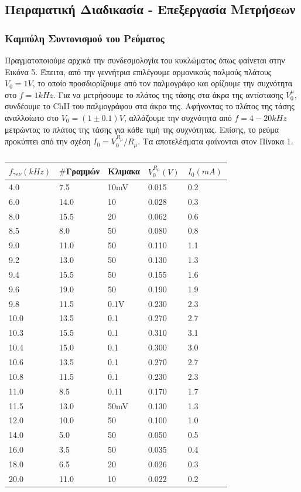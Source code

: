 \documentclass[a4paper]{article}
\begin{document}
\subsection*{Πειραματική Διαδικασία - Επεξεργασία Μετρήσεων}
\subsubsection*{Καμπύλη Συντονισμού του Ρεύματος}
Πραγματοποιούμε αρχικά την συνδεσμολογία του κυκλώματος όπως φαίνεται στην Εικόνα 5. Έπειτα, από την γεννήτρια επιλέγουμε αρμονικούς παλμούς πλάτους $V_0=1V$, το οποίο προσδιορίζουμε από τον παλμογράφο και ορίζουμε την συχνότητα στο $f = 1kHz$. Για να μετρήσουμε το πλάτος της τάσης στα άκρα της αντίστασης $V_0^{\mu}$, συνδέουμε το ChII του παλμογράφου στα άκρα της. Αφήνοντας το πλάτος της τάσης αναλλοίωτο στο $V_0=(1\pm0.1)V$, αλλάζουμε την συχνότητα από $f=4-20kHz$ μετρώντας το πλάτος της τάσης για κάθε τιμή της συχνότητας. Επίσης, το ρεύμα προκύπτει από την σχέση $I_0 = V_0^{R_\mu} /R_\mu$. Τα αποτελέσματα φαίνονται στον Πίνακα 1. 
\newpage

\begin{table}
\centering 
\caption{ }
\begin{tabular}{l|l|l|l|l} 
$f_{γεν}(kHz)$  & $\#$Γραμμών & Κλιμακα\footnotemark &$V_0^{R_\mu}(V)$ & $I_0(mA)$ \\ 
\hline\hline
4.0&7.5&10mV&0.015&0.2\\ 
6.0&14.0&10&0.028&0.3\\ 
8.0&15.5&20&0.062&0.6\\ 
8.5&8.0&50&0.080&0.8\\ 
9.0&11.0&50&0.110&1.1\\ 
9.2&13.0&50&0.130&1.3\\ 
9.4&15.5&50&0.155&1.6\\ 
9.6&19.0&50&0.190&1.9\\ 
9.8&11.5&0.1V&0.230&2.3\\ 
10.0&13.5&0.1&0.270&2.7\\ 
10.3&15.5&0.1&0.310&3.1\\ 
10.4&15.0&0.1&0.300&3.0\\ 
10.6&13.5&0.1&0.270&2.7\\ 
10.8&11.5&0.1&0.230&2.3\\ 
11.0&8.5&0.11&0.170&1.7\\ 
11.5&13.0&50mV&0.130&1.3\\ 
12.0&10.0&50&0.100&1.0\\ 
14.0&5.0&50&0.050&0.5\\ 
16.0&3.5&50&0.035&0.4\\ 
18.0&6.5&20&0.026&0.3\\ 
20.0&11.0&10&0.022&0.2\\ 
\end{tabular}
\end{table}
\end{document}
